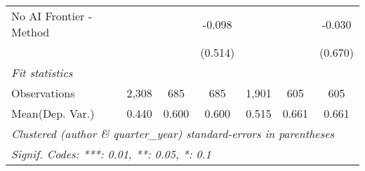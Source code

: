 \begin{tabular}{lcccccc}
   No AI Frontier - Method &         &             & -0.098       &                &             & -0.030\\   
                           &         &             & (0.514)      &                &             & (0.670)\\   
   \midrule
   \emph{Fit statistics}\\
   Observations            & 2,308   & 685         & 685          & 1,901          & 605         & 605\\  
Mean(Dep. Var.) & 0.440 & 0.600 & 0.600 & 0.515 & 0.661 & 0.661 \\
   \midrule \midrule
   \multicolumn{7}{l}{\emph{Clustered (author \& quarter\_year) standard-errors in parentheses}}\\
   \multicolumn{7}{l}{\emph{Signif. Codes: ***: 0.01, **: 0.05, *: 0.1}}\\
\end{tabular}
\par\endgroup
